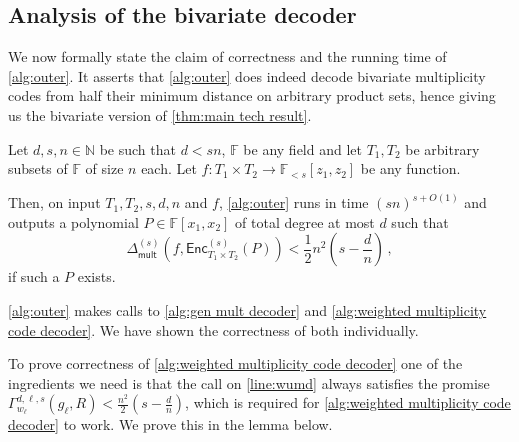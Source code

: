 \documentclass{theoretics}
\def\Natural{\mathbb{N}}
\def\Field{\mathbb{F}}
\let\N\Natural
\let\F\Field
\newcommand{\enc}{{\mathsf{Enc}}}
\newcommand{\Delm}{\Delta_{\mathsf{mult}}}
\begin{document}
	\subsection{Analysis of the bivariate decoder}
	
	We now formally state the claim of correctness and the running time of
	\cref{alg:outer}. It asserts that \cref{alg:outer} does indeed decode
	bivariate  multiplicity codes from half their minimum distance on
	arbitrary product sets, hence giving us the bivariate version of \cref{thm:main tech result}.
	
	\begin{theorem}%
		\label{THM:CORRECTNESS_OF_BIVARIATE_DECODER}
		Let $d, s, n \in \N$ be such that $d < sn$, $\F$ be any  field and let
		$T_1, T_2$ be arbitrary subsets of $\F$ of size $n$ each. Let $f\colon
		T_1 \times T_2 \to \F_{<s}[z_1, z_2]$ be any function. 
		
		Then, on input $T_1, T_2, s, d, n$ and $f$, \cref{alg:outer} runs in time $(sn)^{s + O(1)}$ and outputs a polynomial $P \in \F[x_1, x_2]$ of total degree at most $d$ such that  
		\[
		\Delm^{(s)}(f,\enc^{(s)}_{T_1 \times T_2}(P)) < \frac{1}{2} n^2 \left(s-\frac{d}{n} \right) \, ,
		\]
		if such a $P$ exists. 
	\end{theorem}
	
	\cref{alg:outer} makes calls to \cref{alg:gen mult decoder} and \cref{alg:weighted multiplicity code decoder}. We have shown the correctness of both individually. 
	
	To prove correctness of \cref{alg:weighted multiplicity code decoder} one of the ingredients we need is that the call on \cref{line:wumd} always satisfies the promise $\Gamma_{w_\ell}^{d, \ell, s}(g_\ell,
	R) < \frac{n^2}{2}(s-\frac{d}{n})$, which is required for \cref{alg:weighted multiplicity code decoder} to work. We prove this in the lemma below.
	
\end{document}
